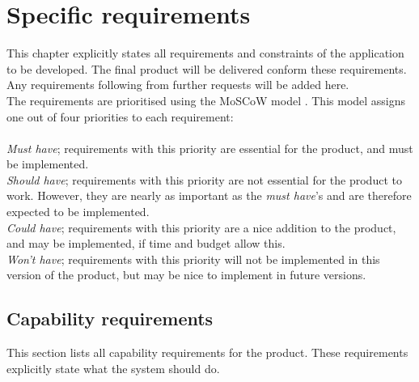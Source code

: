 \chapter{Specific requirements}

This chapter explicitly states all requirements and constraints of the application to be developed. The final product will be delivered conform these requirements. Any requirements following from further requests will be added here. \\
The requirements are prioritised using the MoSCoW model \cite{moscow}. This model assigns one out of four priorities to each requirement: \\
\\
\emph{Must have}; requirements with this priority are essential for the product, and must be implemented. \\
\emph{Should have}; requirements with this priority are not essential for the product to work. However, they are nearly as important as the \emph{must have}'s and are therefore expected to be implemented. \\
\emph{Could have}; requirements with this priority are a nice addition to the product, and may be implemented, if time and budget allow this. \\
\emph{Won't have}; requirements with this priority will not be implemented in this version of the product, but may be nice to implement in future versions.\\

\section{Capability requirements}
This section lists all capability requirements for the product. These requirements explicitly state what the system should do. \\

